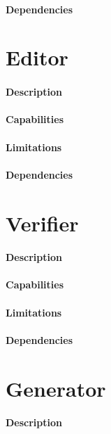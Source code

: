 \paragraph{Dependencies}

\section{Editor} %
\label{sec:editor}

\paragraph{Description}
\paragraph{Capabilities}
\paragraph{Limitations}
\paragraph{Dependencies}

\section{Verifier} %
\label{sec:verifier}

\paragraph{Description}
\paragraph{Capabilities}
\paragraph{Limitations}
\paragraph{Dependencies}

\section{Generator} %
\label{sec:generator}

\paragraph{Description}
